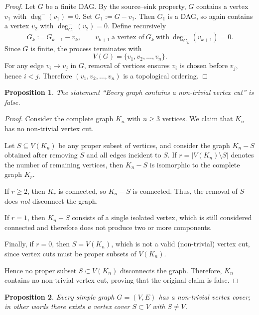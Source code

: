 \documentclass{article}
\theoremstyle{plain}
\newtheorem{proposition}{Proposition}
\theoremstyle{definition}
\theoremstyle{remark}
\begin{document}
\begin{proof}
Let \(G\) be a finite DAG. By the source–sink property, \(G\) contains a
vertex \(v_1\) with \(\deg^{-}(v_1)=0\). Set \(G_1 := G - v_1\). Then
\(G_1\) is a DAG, so again contains a vertex \(v_2\) with
\(\deg^{-}_{G_1}(v_2)=0\). Define recursively
\[
G_{k} := G_{k-1} - v_k,\qquad
v_{k+1}\ \text{a vertex of}\ G_k\ \text{with}\ \deg^-_{G_k}(v_{k+1}) = 0.
\]
Since \(G\) is finite, the process terminates with
\[
V(G)=\{v_1,v_2,\dots,v_n\}.
\]
For any edge \(v_i \to v_j\) in \(G\), removal of vertices ensures
\(v_i\) is chosen before \(v_j\), hence \(i < j\). Therefore
\((v_1, v_2, \dots, v_n)\) is a topological ordering.
\end{proof}

\begin{proposition}
The statement ``Every graph contains a non-trivial vertex cut'' is false.
\end{proposition}

\begin{proof}
Consider the complete graph $K_n$ with $n \ge 3$ vertices. We claim that
$K_n$ has no non-trivial vertex cut.

Let $S \subseteq V(K_n)$ be any proper subset of vertices, and consider the
graph $K_n - S$ obtained after removing $S$ and all edges incident to $S$.
If $r = |V(K_n) \setminus S|$ denotes the number of remaining vertices, then
$K_n - S$ is isomorphic to the complete graph $K_r$.

If $r \ge 2$, then $K_r$ is connected, so $K_n - S$ is connected. Thus, the
removal of $S$ does \emph{not} disconnect the graph.

If $r = 1$, then $K_n - S$ consists of a single isolated vertex, which is
still considered connected and therefore does not produce two or more
components.

Finally, if $r = 0$, then $S = V(K_n)$, which is not a valid (non-trivial)
vertex cut, since vertex cuts must be proper subsets of $V(K_n)$.

Hence no proper subset $S \subset V(K_n)$ disconnects the graph. Therefore,
$K_n$ contains no non-trivial vertex cut, proving that the original claim is
false.
\end{proof}

\begin{proposition}
Every simple graph \(G=(V,E)\) has a non-trivial
vertex cover; in other words there exists a vertex cover \(S\subset V\) with
\(S\neq V\).
\end{proposition}
\end{document}
